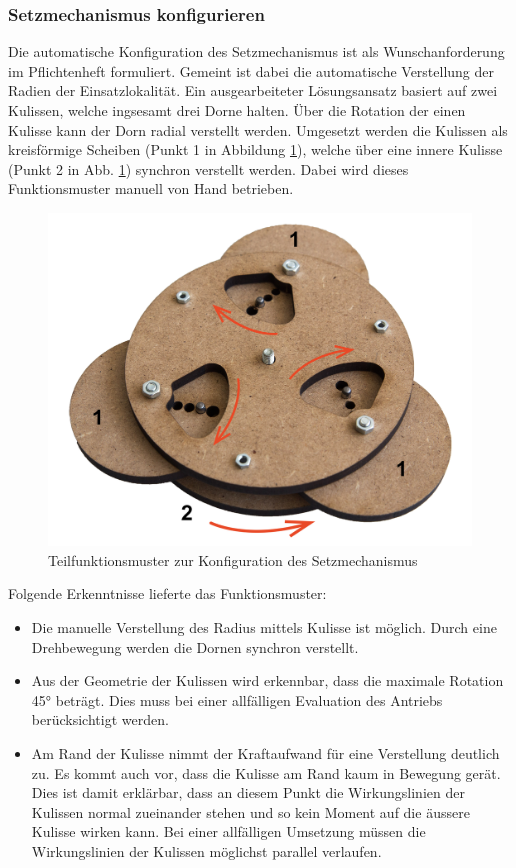 \subsubsection{Setzmechanismus konfigurieren}
Die automatische Konfiguration des Setzmechanismus ist als Wunschanforderung im Pflichtenheft formuliert. Gemeint ist dabei die automatische Verstellung der Radien der Einsatzlokalität. Ein ausgearbeiteter Lösungsansatz basiert auf zwei Kulissen, welche ingsesamt drei Dorne halten. Über die Rotation der einen Kulisse kann der Dorn radial verstellt werden. Umgesetzt werden die Kulissen als kreisförmige Scheiben (Punkt 1 in Abbildung \ref{fig:setzmech_konfig}), welche über eine innere Kulisse (Punkt 2 in Abb. \ref{fig:setzmech_konfig}) synchron verstellt werden. Dabei wird dieses Funktionsmuster manuell von Hand betrieben.
\begin{figure}[H]
	\includegraphics[width=1\textwidth]{Illustrationen/5-Konzept/setzmech_konfig_1.jpg}
	\caption{Teilfunktionsmuster zur Konfiguration des Setzmechanismus}
	\label{fig:setzmech_konfig}
\end{figure}
Folgende Erkenntnisse lieferte das Funktionsmuster:
\begin{itemize}
	\item Die manuelle Verstellung des Radius mittels Kulisse ist möglich. Durch eine Drehbewegung werden die Dornen synchron verstellt.
	
	\item Aus der Geometrie der Kulissen wird erkennbar, dass die maximale Rotation 45° beträgt. Dies muss bei einer allfälligen Evaluation des Antriebs berücksichtigt werden.
	
	\item Am Rand der Kulisse nimmt der Kraftaufwand für eine Verstellung deutlich zu. Es kommt auch vor, dass die Kulisse am Rand kaum in Bewegung gerät. Dies ist damit erklärbar, dass an diesem Punkt die Wirkungslinien der Kulissen normal zueinander stehen und so kein Moment auf die äussere Kulisse wirken kann. Bei einer allfälligen Umsetzung müssen die Wirkungslinien der Kulissen möglichst parallel verlaufen. 
\end{itemize} 
